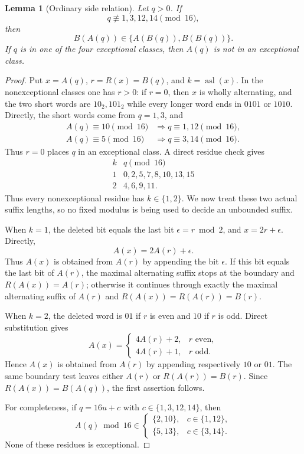 \documentclass[11pt,a4paper]{article}
\newtheorem{lemma}[theorem]{Lemma}
\theoremstyle{definition}
\theoremstyle{remark}
\newcommand{\asl}{\operatorname{asl}}
\begin{document}
\begin{lemma}[Ordinary side relation]\label{lem:ordinary-side}
Let $q>0$.  If
\[
 q\not\equiv1,3,12,14\pmod {16},
\]
then
\[
 B(A(q))\in\{A(B(q)),B(B(q))\}.
\]
If $q$ is in one of the four exceptional classes, then $A(q)$ is not in an
exceptional class.
\end{lemma}

\begin{proof}
Put $x=A(q)$, $r=R(x)=B(q)$, and $k=\asl(x)$.  In the
nonexceptional classes one has $r>0$: if $r=0$, then $x$ is wholly
alternating, and the two short words are $10_2,101_2$ while every longer
word ends in $0101$ or $1010$.  Directly, the short words come from
$q=1,3$, and
\[
\begin{aligned}
 A(q)\equiv10\pmod {16}&\Longrightarrow q\equiv1,12\pmod {16},\\
 A(q)\equiv5\pmod {16}&\Longrightarrow q\equiv3,14\pmod {16}.
\end{aligned}
\]
Thus $r=0$ places $q$ in an exceptional class.  A direct residue check gives
\[
\begin{array}{c|c}
 k& q\pmod {16}\\ \hline
 1&0,2,5,7,8,10,13,15\\
 2&4,6,9,11.
\end{array}
\]
Thus every nonexceptional residue has $k\in\{1,2\}$.  We now treat these
two actual suffix lengths, so no fixed modulus is being used to decide an
unbounded suffix.

When $k=1$, the deleted bit equals the last bit
$\epsilon=r\bmod2$, and $x=2r+\epsilon$.  Directly,
\[
 A(x)=2A(r)+\epsilon.
\]
Thus $A(x)$ is obtained from $A(r)$ by appending the bit $\epsilon$.
If this bit equals the last bit of $A(r)$, the maximal alternating suffix
stops at the boundary and $R(A(x))=A(r)$; otherwise it continues through
exactly the maximal alternating suffix of $A(r)$ and
$R(A(x))=R(A(r))=B(r)$.

When $k=2$, the deleted word is $01$ if $r$ is even and $10$ if $r$ is
odd.  Direct substitution gives
\[
 A(x)=
 \begin{cases}
  4A(r)+2,&r\text{ even},\\
  4A(r)+1,&r\text{ odd}.
 \end{cases}
\]
Hence $A(x)$ is obtained from $A(r)$ by appending respectively $10$ or
$01$.  The same boundary test leaves either $A(r)$ or
$R(A(r))=B(r)$.  Since $R(A(x))=B(A(q))$, the first assertion follows.

For completeness, if $q=16u+c$ with
$c\in\{1,3,12,14\}$, then
\[
 A(q)\bmod16\in
 \begin{cases}
  \{2,10\},&c\in\{1,12\},\\
  \{5,13\},&c\in\{3,14\}.
 \end{cases}
\]
None of these residues is exceptional.
\end{proof}
\end{document}

